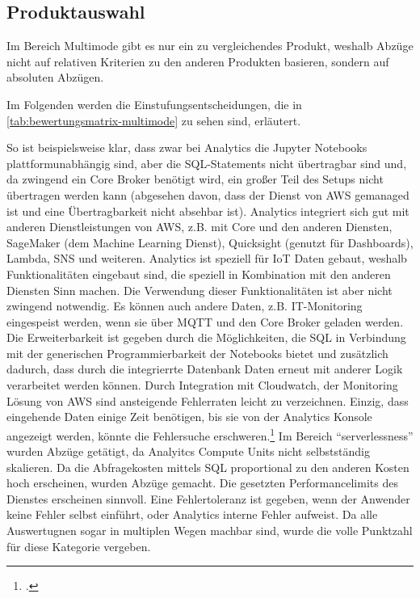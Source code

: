 

\subsection{Produktauswahl}
Im Bereich Multimode gibt es nur ein zu vergleichendes Produkt, weshalb Abzüge nicht auf relativen Kriterien zu den anderen Produkten basieren, sondern auf absoluten Abzügen.

Im Folgenden werden die Einstufungsentscheidungen, die in \autoref{tab:bewertungsmatrix-multimode} zu sehen sind, erläutert.

So ist beispielsweise klar, dass zwar bei \AWSIOT Analytics die Jupyter Notebooks plattformunabhängig sind, aber die \ac{SQL}-Statements nicht übertragbar sind und, da zwingend ein \AWSIOT Core Broker benötigt wird, ein großer Teil des Setups nicht übertragen werden kann (abgesehen davon, dass der Dienst von \ac{AWS} gemanaged ist und eine Übertragbarkeit nicht absehbar ist).
\AWSIOT Analytics integriert sich gut mit anderen Dienstleistungen von AWS, z.B. mit \AWSIOT Core und den anderen \AWSIOT Diensten, SageMaker (dem Machine Learning Dienst), Quicksight (genutzt für Dashboards), Lambda, \ac{SNS} und weiteren.
\AWSIOT Analytics ist speziell für \ac{IoT} Daten gebaut, weshalb Funktionalitäten eingebaut sind, die speziell in Kombination mit den anderen \AWSIOT Diensten Sinn machen. Die Verwendung dieser Funktionalitäten ist aber nicht zwingend notwendig. Es können auch andere Daten, z.B. IT-Monitoring eingespeist werden, wenn sie über \ac{MQTT} und den \AWSIOT Core Broker geladen werden.
Die Erweiterbarkeit ist gegeben durch die Möglichkeiten, die \ac{SQL} in Verbindung mit der generischen Programmierbarkeit der Notebooks bietet und zusätzlich dadurch, dass durch die integrierrte Datenbank Daten erneut mit anderer Logik verarbeitet werden können.
Durch Integration mit Cloudwatch, der Monitoring Lösung von \ac{AWS} sind ansteigende Fehlerraten leicht zu verzeichnen. Einzig, dass eingehende Daten einige Zeit benötigen, bis sie von der \AWSIOT Analytics Konsole angezeigt werden, könnte die Fehlersuche erschweren.\footcite[Vgl.][]{AmazonWebServicesInc..o.J.aw}
Im Bereich \enquote{serverlessness} wurden Abzüge getätigt, da Analyitcs Compute Units nicht selbstständig skalieren.
Da die Abfragekosten mittels \ac{SQL} proportional zu den anderen Kosten hoch erscheinen, wurden Abzüge gemacht.
Die gesetzten Performancelimits des Dienstes erscheinen sinnvoll. Eine Fehlertoleranz ist gegeben, wenn der Anwender keine Fehler selbst einführt, oder \AWSIOT Analytics interne Fehler aufweist. Da alle Auswertugnen sogar in multiplen Wegen machbar sind, wurde die volle Punktzahl für diese Kategorie vergeben.


